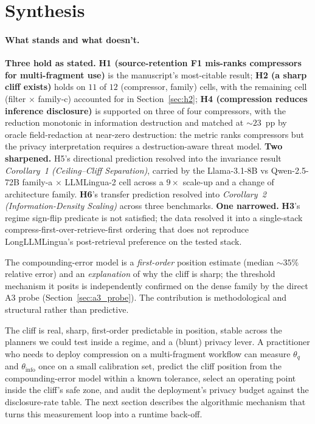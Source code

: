 \section{Synthesis}
\label{sec:synthesis}

\paragraph{What stands and what doesn't.}
\textbf{Three hold as stated.} \textbf{H1 (source-retention F1
mis-ranks compressors for multi-fragment use)} is the manuscript's
most-citable result; \textbf{H2 (a sharp cliff exists)} holds on
$11$ of $12$ (compressor, family) cells, with the remaining cell
(filter $\times$ family-c) accounted for in Section~\ref{sec:h2};
\textbf{H4 (compression reduces inference disclosure)} is supported
on three of four compressors, with the reduction monotonic in
information destruction and matched at $\sim 23$~pp by oracle
field-redaction at near-zero destruction: the metric ranks
compressors but the privacy interpretation requires a
destruction-aware threat model. \textbf{Two sharpened.}
H5's directional prediction resolved into the invariance
result \emph{Corollary~1 (Ceiling--Cliff Separation)}, carried by
the Llama-3.1-8B vs Qwen-2.5-72B family-a $\times$ LLMLingua-2 cell
across a $9\times$ scale-up and a change of architecture family.
\textbf{H6}'s transfer prediction resolved into
\emph{Corollary~2 (Information-Density Scaling)} across three
benchmarks. \textbf{One narrowed.} \textbf{H3}'s regime sign-flip
predicate is not satisfied; the data resolved it into a single-stack
compress-first-over-retrieve-first ordering that does not reproduce
LongLLMLingua's post-retrieval preference on the tested stack.

The compounding-error model is a \emph{first-order}
position estimate (median $\sim 35\%$ relative error) and an
\emph{explanation} of why the cliff is sharp; the threshold
mechanism it posits is independently confirmed on the dense family
by the direct A3 probe (Section~\ref{sec:a3_probe}). The contribution is methodological and structural rather than predictive.

The cliff is real, sharp, first-order predictable
in position, stable across the planners we could test inside a
regime, and a (blunt) privacy lever. A practitioner who needs to
deploy compression on a multi-fragment workflow can measure
$\theta_q$ and $\theta_\text{info}$ once on a small calibration
set, predict the cliff position from the compounding-error model
within a known tolerance, select an operating point inside the
cliff's safe zone, and audit the deployment's privacy budget
against the disclosure-rate table. The next section describes the
algorithmic mechanism that turns this measurement loop into a
runtime back-off.


